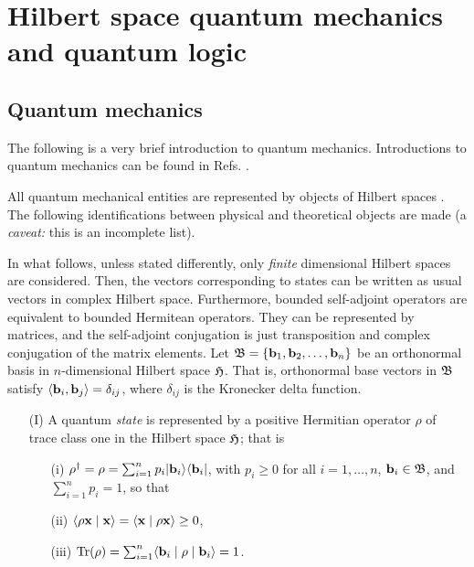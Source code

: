 {\color{Purple}

\section{Hilbert space quantum mechanics and quantum logic}

\subsection{Quantum mechanics}

The following is a very brief introduction to quantum mechanics.
Introductions to quantum mechanics can be found in
Refs. \cite{feynman-III,ba-89,messiah-61,peres,wheeler-Zurek:83}.

All quantum
mechanical entities are represented by objects
of Hilbert spaces \cite{v-neumann-49,birkhoff-36}.
The following identifications between physical and theoretical objects
are made (a {\it caveat:} this is an incomplete list).

In what follows, unless stated differently, only
{\em finite} dimensional Hilbert spaces are considered.
 Then, the vectors
corresponding to states can be written as usual vectors in complex
Hilbert space.
Furthermore, bounded
self-adjoint operators are  equivalent to bounded Hermitean operators.
They can be represented by matrices, and the self-adjoint
conjugation
is just transposition and complex conjugation of the matrix elements.
Let ${\frak B}=\{{\bf b}_1,{\bf b}_2,\ldots , {\bf b}_n\}$ be an orthonormal basis in $n$-dimensional Hilbert space ${\frak H}$.
That is,  orthonormal base vectors in ${\frak B}$
satisfy
$\langle {\bf b}_i, {\bf b}_j\rangle =\delta_{ij}$,
where $\delta_{ij}$ is the Kronecker delta function.

\begin{itemize}
\item[(I)]
 A quantum {\em   state} is represented by
a  positive Hermitian operator  ${    \rho}$
of trace class one in  the Hilbert space ${\frak H} $;
that is
\begin{itemize}
\item[(i)]
 ${    \rho}^\dagger ={    \rho}=\sum_{i=1}^n p_i  \vert {\bf b}_i \rangle \langle {\bf b}_i  \vert $,
    with  $p_i\ge 0$ for all $i=1,\ldots , n$, ${\bf b}_i \in {\frak B}$, and $\sum_{i=1}^n p_i =1$, so that
\item[(ii)]
$\langle {    \rho}{\bf x}\mid {\bf x}\rangle =\langle {\bf x}\mid {    \rho}{\bf x}\rangle  \ge 0$,
\item[(iii)]
$\textrm{Tr}( {    \rho})=\sum_{i=1}^n \langle {\bf b}_i \mid {    \rho} \mid  {\bf b}_i \rangle =1 $.
\end{itemize}


\end{itemize}}
